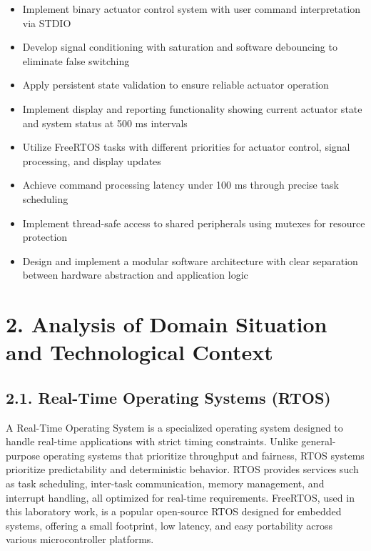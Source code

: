 \documentclass[12pt]{article}
\begin{document}
\begin{itemize}
    \item Implement binary actuator control system with user command interpretation via STDIO
    \item Develop signal conditioning with saturation and software debouncing to eliminate false switching
    \item Apply persistent state validation to ensure reliable actuator operation
    \item Implement display and reporting functionality showing current actuator state and system status at 500 ms intervals
    \item Utilize FreeRTOS tasks with different priorities for actuator control, signal processing, and display updates
    \item Achieve command processing latency under 100 ms through precise task scheduling
    \item Implement thread-safe access to shared peripherals using mutexes for resource protection
    \item Design and implement a modular software architecture with clear separation between hardware abstraction and application logic
\end{itemize}

\section*{2. Analysis of Domain Situation and Technological Context}

\subsection*{2.1. Real-Time Operating Systems (RTOS)}

A Real-Time Operating System is a specialized operating system designed to handle real-time applications with strict timing constraints. Unlike general-purpose operating systems that prioritize throughput and fairness, RTOS systems prioritize predictability and deterministic behavior. RTOS provides services such as task scheduling, inter-task communication, memory management, and interrupt handling, all optimized for real-time requirements. FreeRTOS, used in this laboratory work, is a popular open-source RTOS designed for embedded systems, offering a small footprint, low latency, and easy portability across various microcontroller platforms.
\end{document}
